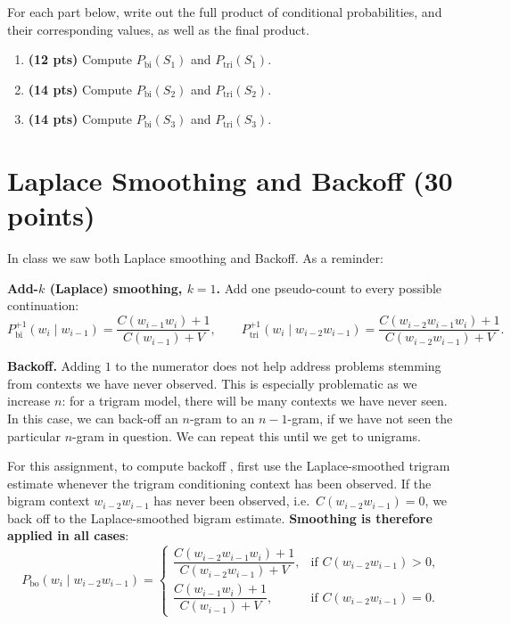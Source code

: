 \documentclass[11pt]{article}
\newcommand{\Count}[1]{\ensuremath{C(#1)}}
\begin{document}
For each part below, write out the full product of conditional probabilities, and their corresponding values, as well as the final product. 

\begin{enumerate}[label=(\alph*)]
  \item \textbf{(12 pts)} Compute $P_{\text{bi}}(S_1)$ and $P_{\text{tri}}(S_1)$.

  \item \textbf{(14 pts)} Compute $P_{\text{bi}}(S_2)$ and $P_{\text{tri}}(S_2)$.

  \item \textbf{(14 pts)} Compute $P_{\text{bi}}(S_3)$ and $P_{\text{tri}}(S_3)$.

\end{enumerate}

\section{Laplace Smoothing and Backoff (30 points)}

In class we saw both Laplace smoothing and Backoff. As a reminder:

\medskip\noindent
\textbf{Add-$k$ (Laplace) smoothing, $k=1$.} Add one pseudo-count to every possible continuation:
\[
P^{+1}_{\text{bi}}(w_i \mid w_{i-1}) = \frac{\Count{w_{i-1} w_i} + 1}{\Count{w_{i-1}} + V},
\qquad
P^{+1}_{\text{tri}}(w_i \mid w_{i-2} w_{i-1}) = \frac{\Count{w_{i-2} w_{i-1} w_i} + 1}{\Count{w_{i-2} w_{i-1}} + V}.
\]

\medskip\noindent
\textbf{Backoff.} Adding $1$ to the numerator does not help address problems stemming from contexts we have never observed. This is especially problematic as we increase $n$: for a trigram model, there will be many contexts we have never seen. 
In this case, we can back-off an $n$-gram to an $n-1$-gram, if we have not seen the particular $n$-gram in question. We can repeat this until we get to unigrams.

For this assignment, to compute backoff , first use the Laplace-smoothed trigram estimate whenever the trigram conditioning context has been observed. If the bigram context $w_{i-2}w_{i-1}$ has never been observed, i.e.\ $\Count{w_{i-2}w_{i-1}} = 0$,
we back off to the Laplace-smoothed bigram estimate. \textbf{Smoothing is therefore
applied in all cases}:
\[
P_{\text{bo}}(w_i \mid w_{i-2} w_{i-1}) =
\begin{cases}
\dfrac{\Count{w_{i-2} w_{i-1} w_i} + 1}{\Count{w_{i-2} w_{i-1}} + V}, & \text{if } \Count{w_{i-2} w_{i-1}} > 0, \\[12pt]
\dfrac{\Count{w_{i-1} w_i} + 1}{\Count{w_{i-1}} + V},                 & \text{if } \Count{w_{i-2} w_{i-1}} = 0.
\end{cases}
\]
\end{document}
